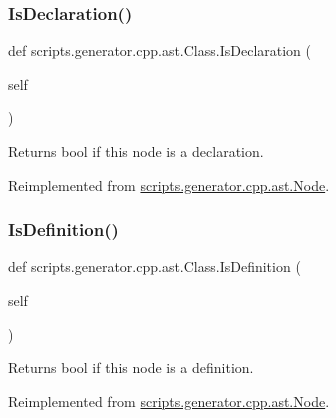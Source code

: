 \mbox{\label{classscripts_1_1generator_1_1cpp_1_1ast_1_1_class_a27fbcb116e330e2c0be9edb285c7ce9b}} 
\subsubsection{\texorpdfstring{IsDeclaration()}{IsDeclaration()}}
{\footnotesize\ttfamily def scripts.\+generator.\+cpp.\+ast.\+Class.\+Is\+Declaration (\begin{DoxyParamCaption}\item[{}]{self }\end{DoxyParamCaption})}

\begin{DoxyVerb}Returns bool if this node is a declaration.\end{DoxyVerb}
 

Reimplemented from \mbox{\hyperlink{classscripts_1_1generator_1_1cpp_1_1ast_1_1_node_a47bce3a2a7212267bc0171fff16fc459}{scripts.\+generator.\+cpp.\+ast.\+Node}}.

\mbox{\label{classscripts_1_1generator_1_1cpp_1_1ast_1_1_class_af1c4b935189850c6515c7fe75046c292}} 
\subsubsection{\texorpdfstring{IsDefinition()}{IsDefinition()}}
{\footnotesize\ttfamily def scripts.\+generator.\+cpp.\+ast.\+Class.\+Is\+Definition (\begin{DoxyParamCaption}\item[{}]{self }\end{DoxyParamCaption})}

\begin{DoxyVerb}Returns bool if this node is a definition.\end{DoxyVerb}
 

Reimplemented from \mbox{\hyperlink{classscripts_1_1generator_1_1cpp_1_1ast_1_1_node_a53663c2acef5d6954d065e11d2fd53a1}{scripts.\+generator.\+cpp.\+ast.\+Node}}.

